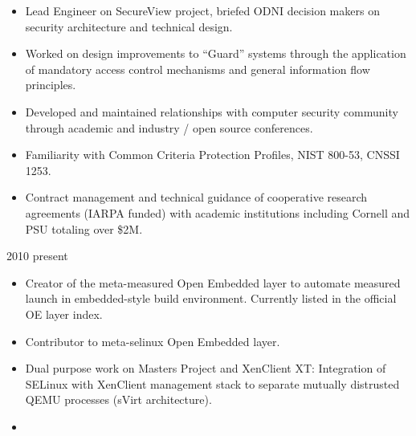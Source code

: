 \documentclass[letterpaper,11pt]{article}
\begin{document}
      \begin {itemize}
        \setlength {\itemsep}{1pt}
        \setlength {\parskip}{0pt}
        \setlength {\parsep}{0pt}
      \item Lead Engineer on SecureView project, briefed ODNI decision makers on security architecture and technical design.
      \item Worked on design improvements to ``Guard'' systems through the application of mandatory access control mechanisms and general information flow principles.
      \item Developed and maintained relationships with computer security community through academic and industry / open source conferences.
      \item Familiarity with Common Criteria Protection Profiles, NIST 800-53, CNSSI 1253.
      \item Contract management and technical guidance of cooperative research agreements (IARPA funded) with academic institutions including Cornell and PSU totaling over \$2M.
      \end {itemize}
       {2010} {present}
      \begin {itemize}
        \setlength {\itemsep}{1pt}
        \setlength {\parskip}{0pt}
        \setlength {\parsep}{0pt}
      \item
        Creator of the meta-measured Open Embedded layer to automate measured launch in embedded-style build environment.
        Currently listed in the official OE layer index.
      \item Contributor to meta-selinux Open Embedded layer.
      \item
        Dual purpose work on Masters Project and XenClient XT:
        Integration of SELinux with XenClient management stack to separate mutually distrusted QEMU processes (sVirt architecture).
      \end {itemize}
      \pagebreak
    \begin{itemize}
    \item[]
    \end{itemize}
\end{document}
